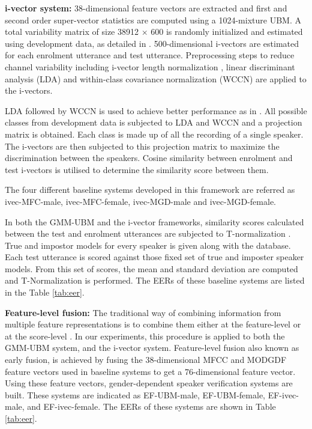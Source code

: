 \documentclass{article}
\begin{document}
\textbf{i-vector system:} 
38-dimensional feature vectors are extracted and first and
 second order super-vector statistics are computed using a
 1024-mixture UBM. A total variability matrix of size 38912
 $\times$ 600 is randomly initialized and estimated using
 development data, as detailed in \cite{dehak_ivector, kenny_JFA}. 
500-dimensional i-vectors are estimated for each enrolment
utterance and test utterance. Preprocessing steps to reduce
channel variability including i-vector length normalization
\cite{garciaRomero}, linear discriminant analysis (LDA) and
within-class covariance normalization (WCCN) are applied to the
i-vectors.

LDA followed by WCCN is used to achieve better performance as in \cite{dehak_ivector}. All possible classes from development
data is subjected to LDA and WCCN and a projection matrix is obtained. Each class is made up of all the recording of a single speaker. The i-vectors are then subjected to this projection matrix to maximize the discrimination between the speakers. Cosine similarity between enrolment and test 
i-vectors is utilised to determine the similarity score between
them.

The four different baseline systems developed in this framework
are referred as ivec-MFC-male, ivec-MFC-female, ivec-MGD-male
and ivec-MGD-female.

In both the GMM-UBM and the i-vector frameworks, similarity
scores calculated between the test and enrolment utterances 
are subjected to T-normalization \cite{tnorm}. True and impostor
models for every speaker is given along with the database. Each 
test utterance is scored against those fixed set of true and imposter 
speaker models. From this set of scores, the mean and standard
deviation are computed and T-Normalization is performed. The 
EERs of these baseline systems are listed in the Table \ref{tab:eer}.


\textbf{Feature-level fusion:} The traditional way of combining
information from multiple feature representations is to combine
them either at the feature-level or at the score-level \cite{fusion}. In our experiments, this procedure is applied to
both the GMM-UBM system, and the i-vector system. Feature-level fusion also known as early fusion, is achieved by fusing the
38-dimensional MFCC and MODGDF feature vectors used in baseline
systems to get a 76-dimensional feature vector. Using these
feature vectors, gender-dependent speaker verification systems
 are built. These systems are indicated as EF-UBM-male, 
 EF-UBM-female, EF-ivec-male, and EF-ivec-female. The EERs of
 these systems are shown in Table  \ref{tab:eer}.
\end{document}
